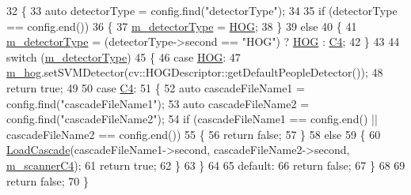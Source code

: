 \begin{DoxyCode}
32 \{
33     \textcolor{keyword}{auto} detectorType = config.find(\textcolor{stringliteral}{"detectorType"});
34 
35     \textcolor{keywordflow}{if} (detectorType == config.end())
36     \{
37         \mbox{\hyperlink{class_pedestrian_detector_a4e0492d82780eb31f763972173d56d9d}{m\_detectorType}} = \mbox{\hyperlink{class_pedestrian_detector_aa2136624089c144b4ef5f3598de00d8ca47cb01f997c4439468112272761fc7de}{HOG}};
38     \}
39     \textcolor{keywordflow}{else}
40     \{
41         \mbox{\hyperlink{class_pedestrian_detector_a4e0492d82780eb31f763972173d56d9d}{m\_detectorType}} = (detectorType->second == \textcolor{stringliteral}{"HOG"}) ? \mbox{\hyperlink{class_pedestrian_detector_aa2136624089c144b4ef5f3598de00d8ca47cb01f997c4439468112272761fc7de}{HOG}} : 
      \mbox{\hyperlink{class_pedestrian_detector_aa2136624089c144b4ef5f3598de00d8ca408a85378caa7239ba0ded11495782fd}{C4}};
42     \}
43 
44     \textcolor{keywordflow}{switch} (\mbox{\hyperlink{class_pedestrian_detector_a4e0492d82780eb31f763972173d56d9d}{m\_detectorType}})
45     \{
46     \textcolor{keywordflow}{case} \mbox{\hyperlink{class_pedestrian_detector_aa2136624089c144b4ef5f3598de00d8ca47cb01f997c4439468112272761fc7de}{HOG}}:
47         \mbox{\hyperlink{class_pedestrian_detector_ad00796408688b6465fb988796536680d}{m\_hog}}.setSVMDetector(cv::HOGDescriptor::getDefaultPeopleDetector());
48         \textcolor{keywordflow}{return} \textcolor{keyword}{true};
49 
50     \textcolor{keywordflow}{case} \mbox{\hyperlink{class_pedestrian_detector_aa2136624089c144b4ef5f3598de00d8ca408a85378caa7239ba0ded11495782fd}{C4}}:
51     \{
52         \textcolor{keyword}{auto} cascadeFileName1 = config.find(\textcolor{stringliteral}{"cascadeFileName1"});
53         \textcolor{keyword}{auto} cascadeFileName2 = config.find(\textcolor{stringliteral}{"cascadeFileName2"});
54         \textcolor{keywordflow}{if} (cascadeFileName1 == config.end() || cascadeFileName2 == config.end())
55         \{
56             \textcolor{keywordflow}{return} \textcolor{keyword}{false};
57         \}
58         \textcolor{keywordflow}{else}
59         \{
60             \mbox{\hyperlink{c4-pedestrian-detector_8cpp_a1c2c730891bb9a5800d3761e8cfaa160}{LoadCascade}}(cascadeFileName1->second, cascadeFileName2->second, 
      \mbox{\hyperlink{class_pedestrian_detector_a68a45a369623a3492065bdf29e81b29c}{m\_scannerC4}});
61             \textcolor{keywordflow}{return} \textcolor{keyword}{true};
62         \}
63     \}
64 
65     \textcolor{keywordflow}{default}:
66         \textcolor{keywordflow}{return} \textcolor{keyword}{false};
67     \}
68 
69     \textcolor{keywordflow}{return} \textcolor{keyword}{false};
70 \}
\end{DoxyCode}
